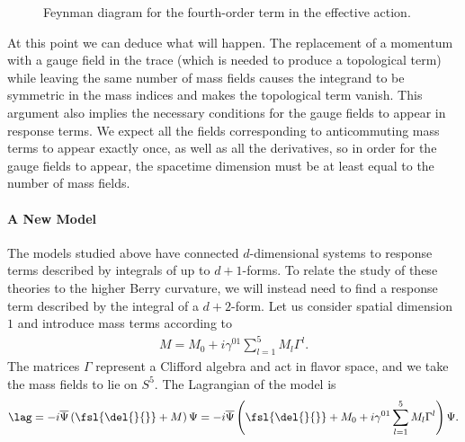 \begin{figure}[!ht]
	\centering
	\caption{Feynman diagram for the fourth-order term in the effective action.}
	\label{fig:fourth_order_1d_fd}
\end{figure}

At this point we can deduce what will happen. The replacement of a momentum with a gauge field in the trace (which is needed to produce a topological term) while leaving the same number of mass fields causes the integrand to be symmetric in the mass indices and makes the topological term vanish. This argument also implies the necessary conditions for the gauge fields to appear in response terms. We expect all the fields corresponding to anticommuting mass terms to appear exactly once, as well as all the derivatives, so in order for the gauge fields to appear, the spacetime dimension must be at least equal to the number of mass fields.

\paragraph{A New Model}
The models studied above have connected $d$-dimensional systems to response terms described by integrals of up to $d + 1$-forms. To relate the study of these theories to the higher Berry curvature, we will instead need to find a response term described by the integral of a $d + 2$-form. Let us consider spatial dimension $1$ and introduce mass terms according to
\begin{align*}
	M = M_{0} + i\gamma^{01}\sum\limits_{l = 1}^{5}M_{l}\Gamma^{l}.
\end{align*}
The matrices $\Gamma$ represent a Clifford algebra and act in flavor space, and we take the mass fields to lie on $S^{5}$. The Lagrangian of the model is
\begin{align*}
	\lag = -i\overline{\Psi}\left(\fsl{\del{}{}} + M\right)\Psi = -i\overline{\Psi}\left(\fsl{\del{}{}} + M_{0} + i\gamma^{01}\sum\limits_{l = 1}^{5}M_{l}\Gamma^{l}\right)\Psi.
\end{align*}

